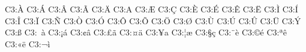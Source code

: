 \newutfsyn C3:^^80{\`A} %
\newutfsyn C3:^^81{\'A} %
\newutfsyn C3:^^82{\^A} %
\newutfsyn C3:^^83{\~A} %
\newutfsyn C3:^^84{\"A} %
\newutfsyn C3:^^85{\°A} %
\newutfsyn C3:^^86{\AE} %
\newutfsyn C3:^^87{\c C}%
\newutfsyn C3:^^88{\`E} %
\newutfsyn C3:^^89{\'E} %
\newutfsyn C3:^^8a{\^E} %
\newutfsyn C3:^^8b{\"E} %
\newutfsyn C3:^^8c{\`I} %
\newutfsyn C3:^^8d{\'I} %
\newutfsyn C3:^^8e{\^I} %
\newutfsyn C3:^^8f{\"I} %
\newutfsyn C3:^^91{\~N} %
\newutfsyn C3:^^92{\`O} %
\newutfsyn C3:^^93{\'O} %
\newutfsyn C3:^^94{\^O} %
\newutfsyn C3:^^95{\~O} %
\newutfsyn C3:^^96{\"O} %
\newutfsyn C3:^^98{\O}  %
\newutfsyn C3:^^99{\`U} %
\newutfsyn C3:^^9a{\'U} %
\newutfsyn C3:^^9b{\^U} %
\newutfsyn C3:^^9c{\"U} %
\newutfsyn C3:^^9d{\'Y} %
\newutfsyn C3:^^9f{\ss} %
\newutfsyn C3:^^a0{\`a} %
\newutfsyn C3:^^a1{\'a} %
\newutfsyn C3:^^a2{\^a} %
\newutfsyn C3:^^a3{\~a} %
\newutfsyn C3:^^a4{\"a} %
\newutfsyn C3:^^a5{\°a} %
\newutfsyn C3:^^a6{\ae} %
\newutfsyn C3:^^a7{\c c}%
\newutfsyn C3:^^a8{\`e} %
\newutfsyn C3:^^a9{\'e} %
\newutfsyn C3:^^aa{\^e} %
\newutfsyn C3:^^ab{\"e} %
\newutfsyn C3:^^ac{\`i} %
